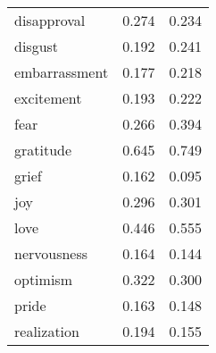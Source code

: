 \documentclass[11pt,a4paper]{article}
\begin{document}
\begin{table}[h!]
{\begin{centering}
\begin{tabular}{@{}lcc@{}}
disapproval      & 0.274                                                                     & 0.234                                                            \\
disgust          & 0.192                                                                     & 0.241                                                            \\
embarrassment    & 0.177                                                                     & 0.218                                                            \\
excitement       & 0.193                                                                     & 0.222                                                            \\
fear             & 0.266                                                                     & 0.394                                                            \\
gratitude        & 0.645                                                                     & 0.749                                                            \\
grief            & 0.162                                                                     & 0.095                                                            \\
joy              & 0.296                                                                     & 0.301                                                            \\
love             & 0.446                                                                     & 0.555                                                            \\
nervousness      & 0.164                                                                     & 0.144                                                            \\
optimism         & 0.322                                                                     & 0.300                                                            \\
pride            & 0.163                                                                     & 0.148                                                            \\
realization      & 0.194                                                                     & 0.155                                                            \\

\end{tabular}
\end{centering}}
\end{table}
\end{document}
